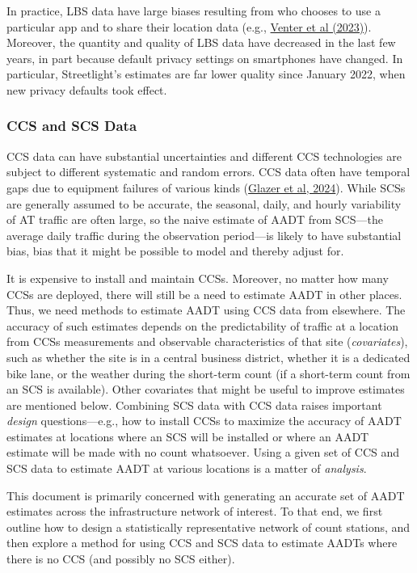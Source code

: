 \documentclass[11pt]{article}
\begin{document}
In practice, LBS data have large biases resulting from who chooses to
use a particular app and to share their location data (e.g.,
\href{https://www.sciencedirect.com/science/article/pii/S0169204623000051}{Venter
et al (2023)}). Moreover, the quantity and quality of LBS data have
decreased in the last few years, in part because default privacy
settings on smartphones have changed. In particular, Streetlight's
estimates are far lower quality since January 2022, when new privacy
defaults took effect.

\subsubsection{CCS and SCS Data}\label{ccs-and-scs-data}

CCS data can have substantial uncertainties and different CCS
technologies are subject to different systematic and random errors. CCS
data often have temporal gaps due to equipment failures of various kinds
(\href{https://www.researchgate.net/publication/377362665_DATA_CHECKS_FOR_BICYCLE_AND_PEDESTRIAN_COUNTS}{Glazer
et al, 2024}). While SCSs are generally assumed to be accurate, the
seasonal, daily, and hourly variability of AT traffic are often large,
so the naive estimate of AADT from SCS---the average daily traffic
during the observation period---is likely to have substantial bias, bias
that it might be possible to model and thereby adjust for.

It is expensive to install and maintain CCSs. Moreover, no matter how
many CCSs are deployed, there will still be a need to estimate AADT in
other places. Thus, we need methods to estimate AADT using CCS data from
elsewhere. The accuracy of such estimates depends on the predictability
of traffic at a location from CCSs measurements and observable
characteristics of that site (\emph{covariates}), such as whether the
site is in a central business district, whether it is a dedicated bike
lane, or the weather during the short-term count (if a short-term count
from an SCS is available). Other covariates that might be useful to
improve estimates are mentioned below. Combining SCS data with CCS data
raises important \emph{design} questions---e.g., how to install CCSs to
maximize the accuracy of AADT estimates at locations where an SCS will
be installed or where an AADT estimate will be made with no count
whatsoever. Using a given set of CCS and SCS data to estimate AADT at
various locations is a matter of \emph{analysis}.

This document is primarily concerned with generating an accurate set of
AADT estimates across the infrastructure network of interest. To that
end, we first outline how to design a statistically representative
network of count stations, and then explore a method for using CCS and
SCS data to estimate AADTs where there is no CCS (and possibly no SCS
either).
\end{document}
